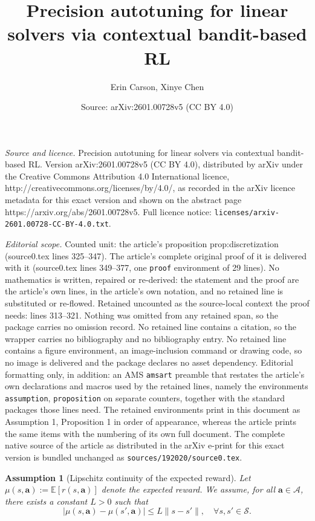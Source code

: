 \documentclass[10pt,a4paper]{amsart}
\title{Precision autotuning for linear solvers via contextual bandit-based RL}
\author{Erin Carson, Xinye Chen}
\date{Source: arXiv:2601.00728v5 (CC BY 4.0)}
\newtheorem{assumption}{Assumption}
\begin{document}
\maketitle

\noindent\emph{Source and licence.} Precision autotuning for linear solvers via contextual bandit-based RL. Version arXiv:2601.00728v5 (CC BY 4.0), distributed by arXiv under the Creative Commons Attribution 4.0 International licence, http://creativecommons.org/licenses/by/4.0/, as recorded in the arXiv licence metadata for this exact version and shown on the abstract page https://arxiv.org/abs/2601.00728v5. Full licence notice: \texttt{licenses/arxiv-2601.00728-CC-BY-4.0.txt}.\par\smallskip

\noindent\textit{Editorial scope.} Counted unit: the article's proposition prop:discretization (source0.tex lines 325--347). The article's complete original proof of it is delivered with it (source0.tex lines 349--377, one \texttt{proof} environment of 29 lines). No mathematics is written, repaired or re-derived: the statement and the proof are the article's own lines, in the article's own notation, and no retained line is substituted or re-flowed.  Retained uncounted as the source-local context the proof needs: lines 313--321.  Nothing was omitted from any retained span, so the package carries no omission record.  No retained line contains a citation, so the wrapper carries no bibliography and no bibliography entry.  No retained line contains a figure environment, an image-inclusion command or drawing code, so no image is delivered and the package declares no asset dependency.  Editorial formatting only, in addition: an AMS \texttt{amsart} preamble that restates the article's own declarations and macros used by the retained lines, namely the environments \texttt{assumption}, \texttt{proposition} on separate counters, together with the standard packages those lines need.  The retained environments print in this document as Assumption 1, Proposition 1 in order of appearance, whereas the article prints the same items with the numbering of its own full document.  The complete native source of the article as distributed in the arXiv e-print for this exact version is bundled unchanged as \texttt{sources/192020/source0.tex}.
\begin{assumption}[Lipschitz continuity of the expected reward]
\label{ass:lipschitz}
Let $\mu(s,\mathbf{a}) := \mathbb{E}[r(s,\mathbf{a})]$ denote the expected reward.
We assume, for all $\mathbf{a} \in \mathcal{A}$, there exists a constant $L > 0$ such that
\begin{equation}
\label{eq:lipschitz}
|\mu(s,\mathbf{a}) - \mu(s',\mathbf{a})| \le L \| s - s' \|, \quad \forall s, s' \in \mathcal{S}.
\end{equation}
\end{assumption}
\end{document}
